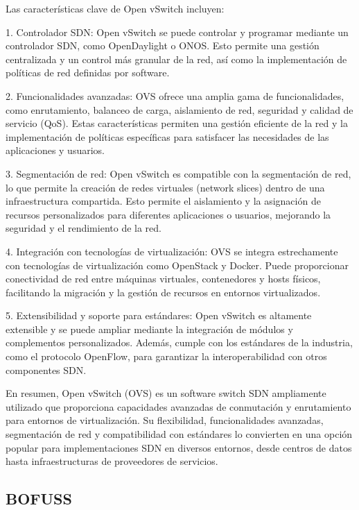 Las características clave de Open vSwitch incluyen:

1. Controlador SDN: Open vSwitch se puede controlar y programar mediante un controlador SDN, como OpenDaylight o ONOS. Esto permite una gestión centralizada y un control más granular de la red, así como la implementación de políticas de red definidas por software.

2. Funcionalidades avanzadas: OVS ofrece una amplia gama de funcionalidades, como enrutamiento, balanceo de carga, aislamiento de red, seguridad y calidad de servicio (QoS). Estas características permiten una gestión eficiente de la red y la implementación de políticas específicas para satisfacer las necesidades de las aplicaciones y usuarios.

3. Segmentación de red: Open vSwitch es compatible con la segmentación de red, lo que permite la creación de redes virtuales (network slices) dentro de una infraestructura compartida. Esto permite el aislamiento y la asignación de recursos personalizados para diferentes aplicaciones o usuarios, mejorando la seguridad y el rendimiento de la red.

4. Integración con tecnologías de virtualización: OVS se integra estrechamente con tecnologías de virtualización como OpenStack y Docker. Puede proporcionar conectividad de red entre máquinas virtuales, contenedores y hosts físicos, facilitando la migración y la gestión de recursos en entornos virtualizados.

5. Extensibilidad y soporte para estándares: Open vSwitch es altamente extensible y se puede ampliar mediante la integración de módulos y complementos personalizados. Además, cumple con los estándares de la industria, como el protocolo OpenFlow, para garantizar la interoperabilidad con otros componentes SDN.

En resumen, Open vSwitch (OVS) es un software switch SDN ampliamente utilizado que proporciona capacidades avanzadas de conmutación y enrutamiento para entornos de virtualización. Su flexibilidad, funcionalidades avanzadas, segmentación de red y compatibilidad con estándares lo convierten en una opción popular para implementaciones SDN en diversos entornos, desde centros de datos hasta infraestructuras de proveedores de servicios.

\subsection{BOFUSS}
\label{subsec:BOFUSS}